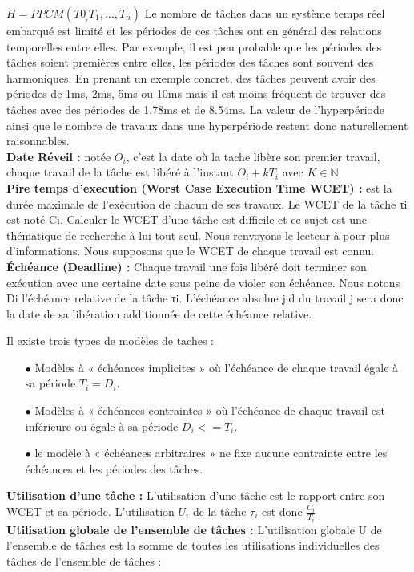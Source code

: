 $H = PPCM({T0_,T_1,…,T_n})$
Le nombre de tâches dans un système temps réel embarqué est limité et les périodes de ces tâches ont en général des relations temporelles entre elles. Par exemple, il est peu probable que les périodes des tâches soient premières entre elles, les périodes des tâches sont souvent des harmoniques. En prenant un exemple concret, des tâches peuvent avoir des périodes de 1ms, 2ms, 5ms ou 10ms mais il est moins fréquent de trouver des tâches avec des périodes de 1.78ms et de 8.54ms. La valeur de l’hyperpériode ainsi que le nombre de travaux dans une hyperpériode restent donc naturellement raisonnables.
\\ \indent \textbf{Date Réveil :} notée $O_i$, c’est la date où la tache libère son premier travail, chaque travail de la tâche est libéré à l’instant $O_i + kT_i$ avec $K \in \mathbb{N}$
\\ \indent \textbf{Pire temps d’execution (Worst Case Execution Time WCET) :} est la durée maximale de l’exécution de chacun de ses travaux. Le WCET de la tâche τi est noté Ci. Calculer le WCET d’une tâche est difficile et ce sujet est une thématique de recherche à lui tout seul. Nous renvoyons le lecteur à \cite{WEE+08} pour plus d’informations. Nous supposons que le WCET de chaque travail est connu.
\\ \indent \textbf{Échéance (Deadline) :} Chaque travail une fois libéré doit terminer son exécution avec une certaine date sous peine de violer son échéance. Nous notons Di l’échéance relative de la tâche τi. L’échéance absolue j.d du travail j sera donc la date de sa libération additionnée de cette échéance relative.

Il existe trois types de modèles  de taches : \\

\begin{itemize}
\item[$\bullet$] Modèles à « échéances implicites » où l’échéance de chaque travail égale à sa période $T_i = D_i$.
\item[$\bullet$] Modèles à « échéances contraintes » où l’échéance de chaque travail est inférieure ou égale à sa période $D_i <= T_i$.
\item[$\bullet$] le modèle à « échéances arbitraires » ne fixe aucune contrainte entre les échéances et les périodes des tâches.
\end{itemize}

\indent \textbf{Utilisation d’une tâche :} L’utilisation d’une tâche est le rapport entre son WCET et sa période. L’utilisation $U_i$ de la tâche $\tau_{i}$ est donc $\frac{C_i}{T_i}$
\\ \indent \textbf{Utilisation globale de l’ensemble de tâches :} L’utilisation globale U de l’ensemble de tâches est la somme de toutes les utilisations individuelles des tâches de l’ensemble de tâches :

